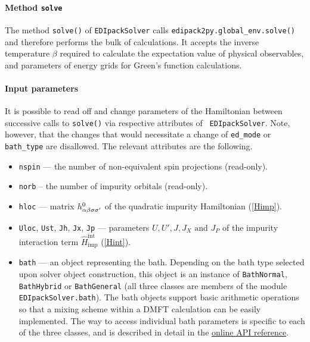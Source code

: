 \documentclass[edipack2.tex]{subfiles}
\begin{document}
\paragraph{{\bf Method {\tt solve}}}
The method {\tt solve()} of {\tt EDIpackSolver} calls
{\tt edipack2py.global\_env.solve()} and therefore performs the bulk of
calculations. It accepts the inverse temperature $\beta$ required to calculate
the expectation value of physical observables, and parameters of energy grids
for Green's function calculations.

\paragraph{{\bf Input parameters}}
It is possible to read off and change parameters of the Hamiltonian between
successive calls to {\tt solve()} via respective attributes of {\tt 
EDIpackSolver}. Note, however, that the changes that would necessitate a change of {\tt ed\_mode} or {\tt bath\_type} are disallowed. The relevant attributes
are the following.
\begin{itemize}
    \item {\tt nspin} --- the number of non-equivalent spin projections 
          (read-only).
    \item {\tt norb} -- the number of impurity orbitals (read-only).
    \item {\tt hloc} --- matrix $h^0_{\alpha\beta\sigma\sigma'}$ of
          the quadratic impurity Hamiltonian (\ref{Himp}).
    \item {\tt Uloc}, {\tt Ust}, {\tt Jh}, {\tt Jx}, {\tt Jp} ---
          parameters $U, U', J, J_X \text{ and } J_P$ of the impurity
          interaction term $\hat{H}^\mathrm{int}_\mathrm{imp}$ (\ref{Hint}).
    \item {\tt bath} --- an object representing the bath. Depending on the
          bath type selected upon solver object construction, this object is an
          instance of {\tt BathNormal}, {\tt BathHybrid} or {\tt BathGeneral}
          (all three classes are members of the module
          {\tt EDIpackSolver.bath}). The bath objects support basic arithmetic
          operations so that a mixing scheme within a DMFT calculation can be
          easily implemented. The way to access individual bath parameters is
          specific to each of the three classes, and is described in detail in the       \href{https://krivenko.github.io/edipack2triqs/documentation.html\#module-edipack2triqs.bath}{online API reference}.
\end{itemize}
\end{document}
